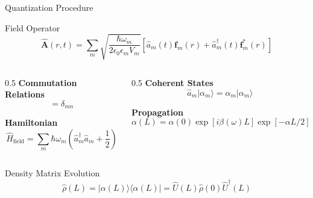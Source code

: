 \documentclass[10pt]{beamer}
\begin{document}
\begin{frame}{Quantization Procedure}
\begin{block}{Field Operator}
\begin{equation*}
\hat{\mathbf{A}}(r,t) = \sum_m \sqrt{\frac{\hbar\omega_m}{2\epsilon_0 \epsilon_m V_m}}\left[\hat{a}_m(t) \mathbf{f}_m(r) + \hat{a}_m^\dagger(t) \mathbf{f}_m^*(r)\right]
\end{equation*}
\end{block}

\begin{columns}
\begin{column}{0.5\textwidth}
\textbf{Commutation Relations}
\begin{equation*}
[\hat{a}_m, \hat{a}_n^\dagger] = \delta_{mn}
\end{equation*}

\textbf{Hamiltonian}
\begin{equation*}
\hat{H}_{\text{field}} = \sum_m \hbar\omega_m\left(\hat{a}_m^\dagger \hat{a}_m + \frac{1}{2}\right)
\end{equation*}
\end{column}

\begin{column}{0.5\textwidth}
\textbf{Coherent States}
\begin{equation*}
\hat{a}_m|\alpha_m\rangle = \alpha_m|\alpha_m\rangle
\end{equation*}

\textbf{Propagation}
\begin{equation*}
\alpha(L) = \alpha(0) \exp[i\beta(\omega)L]\exp[-\alpha L/2]
\end{equation*}
\end{column}
\end{columns}

\begin{block}{Density Matrix Evolution}
\begin{equation*}
\hat{\rho}(L) = |\alpha(L)\rangle\langle\alpha(L)| = \hat{U}(L)\hat{\rho}(0)\hat{U}^\dagger(L)
\end{equation*}
\end{block}
\end{frame}
\end{document}
